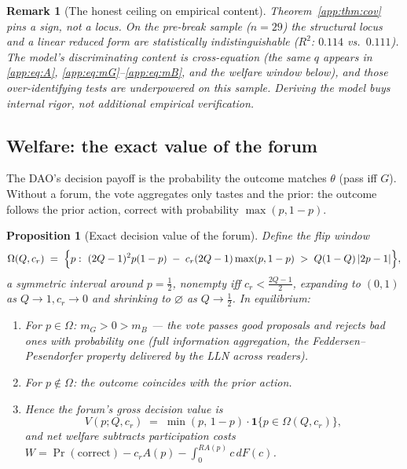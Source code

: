 \documentclass[12pt]{article}
\newtheorem{proposition}{Proposition}
\newtheorem{remark}{Remark}
\newcommand{\Pro}{\Pr}
\newcommand{\ind}[1]{\mathbf{1}\{#1\}}
\begin{document}
\begin{remark}[The honest ceiling on empirical content]
Theorem~\ref{app:thm:cov} pins a \emph{sign}, not a locus. On the pre-break sample
($n=29$) the structural locus and a linear reduced form are statistically
indistinguishable ($R^2$: $0.114$ vs.\ $0.111$). The model's
discriminating content is cross-equation (the same $q$ appears in
\eqref{app:eq:A}, \eqref{app:eq:mG}--\eqref{app:eq:mB}, and the welfare window below), and
those over-identifying tests are underpowered on this sample. Deriving the model buys internal rigor, not additional empirical verification.
\end{remark}

\subsection{Welfare: the exact value of the forum}
\label{app:sec:welfare}

The DAO's decision payoff is the probability the outcome matches $\theta$
(pass iff $G$). Without a forum, the vote aggregates only tastes and the prior:
the outcome follows the prior action, correct with probability $\max(p,1-p)$.

\begin{proposition}[Exact decision value of the forum]\label{app:prop:welfare}
Define the \emph{flip window}
\[
\Omega(Q,c_r)\;=\;\Bigl\{p:\ (2Q-1)^2p(1-p)\;-\;c_r(2Q-1)\max(p,1-p)\;>\;Q(1-Q)\,|2p-1|\Bigr\},
\]
a symmetric interval around $p=\tfrac12$, nonempty iff $c_r<\tfrac{2Q-1}{2}$,
expanding to $(0,1)$ as $Q\to1,c_r\to0$ and shrinking to $\varnothing$ as
$Q\to\tfrac12$. In equilibrium:
\begin{enumerate}[label=(\alph*),itemsep=1pt]
\item For $p\in\Omega$: $m_G>0>m_B$ --- the vote passes good proposals and
rejects bad ones \emph{with probability one} (full information aggregation, the
Feddersen--Pesendorfer property delivered by the LLN across readers).
\item For $p\notin\Omega$: the outcome coincides with the prior action.
\item Hence the forum's gross decision value is
\begin{equation}\label{app:eq:V}
V(p;Q,c_r)\;=\;\min(p,\,1-p)\cdot\ind{p\in\Omega(Q,c_r)},
\end{equation}
and net welfare subtracts participation costs
$W=\Pro(\mathrm{correct})-c_r A(p)-\int_0^{RA(p)}c\,dF(c)$.
\end{enumerate}
\end{proposition}
\end{document}
